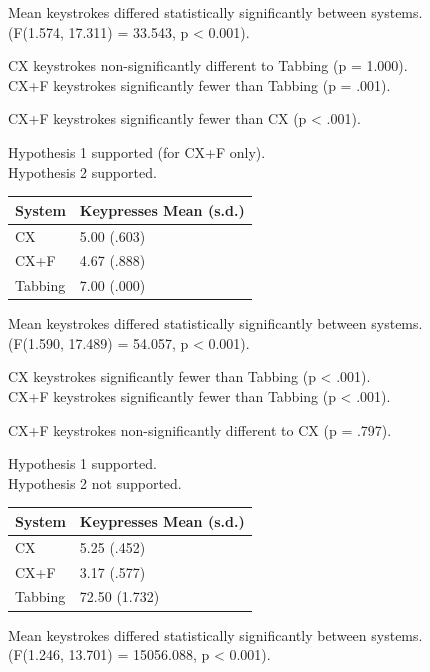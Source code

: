 \documentclass[a4paper, 12pt]{report}
\begin{document}
Mean keystrokes differed statistically significantly between systems.\\
(F(1.574, 17.311) = 33.543, p < 0.001).

CX keystrokes non-significantly different to Tabbing (p = 1.000).\\
CX+F keystrokes significantly fewer than Tabbing (p = .001).

CX+F keystrokes significantly fewer than CX (p < .001).

Hypothesis 1 supported (for CX+F only).\\
Hypothesis 2 supported.

\begin{tabular}{l l}
\hline\hline %
System & Keypresses Mean (s.d.) \\ [0.5ex] %
\hline %
CX & 5.00 (.603)\\
CX+F & 4.67 (.888)\\
Tabbing & 7.00 (.000)\\ [1ex] %
\hline %
\end{tabular}

Mean keystrokes differed statistically significantly between systems.\\
(F(1.590, 17.489) = 54.057, p < 0.001).

CX keystrokes significantly fewer than Tabbing (p < .001).\\
CX+F keystrokes significantly fewer than Tabbing (p < .001).

CX+F keystrokes non-significantly different to CX (p = .797).

Hypothesis 1 supported.\\
Hypothesis 2 not supported.

\begin{tabular}{l l}
\hline\hline %
System & Keypresses Mean (s.d.) \\ [0.5ex] %
\hline %
CX & 5.25 (.452)\\
CX+F & 3.17 (.577)\\
Tabbing & 72.50 (1.732)\\ [1ex] %
\hline %
\end{tabular}

Mean keystrokes differed statistically significantly between systems.\\
(F(1.246, 13.701) = 15056.088, p < 0.001).
\end{document}
